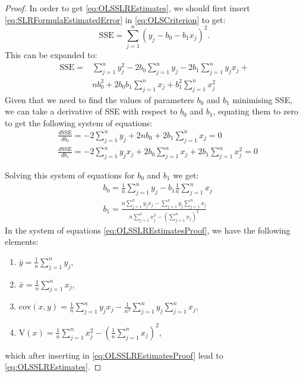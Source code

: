 \documentclass[
]{book}
\providecommand{\tightlist}{%
  \setlength{\itemsep}{0pt}\setlength{\parskip}{0pt}}
\theoremstyle{definition}
\theoremstyle{definition}
\theoremstyle{definition}
\theoremstyle{definition}
\theoremstyle{remark}
\begin{document}
\begin{proof}
In order to get \eqref{eq:OLSSLREstimates}, we should first insert \eqref{eq:SLRFormulaEstimatedError} in \eqref{eq:OLSCriterion} to get:
\begin{equation*}
    \mathrm{SSE} = \sum_{j=1}^n (y_j - {b}_0 - {b}_1 x_j)^2 .
\end{equation*}
This can be expanded to:
\begin{equation*}
    \begin{aligned}
        \mathrm{SSE} = & \sum_{j=1}^n y_j^2 - 2 b_0 \sum_{j=1}^n y_j - 2 b_1 \sum_{j=1}^n y_j x_j + \\
                       & n b_0^2 + 2 b_0 b_1 \sum_{j=1}^n x_j + b_1^2 \sum_{j=1}^n x_j^2
    \end{aligned}
\end{equation*}
Given that we need to find the values of parameters \(b_0\) and \(b_1\) minimising SSE, we can take a derivative of SSE with respect to \(b_0\) and \(b_1\), equating them to zero to get the following system of equations:
\begin{equation*}
    \begin{aligned}
        & \frac{d \mathrm{SSE}}{d b_0} = -2 \sum_{j=1}^n y_j + 2 n b_0 + 2 b_1 \sum_{j=1}^n x_j = 0 \\
        & \frac{d \mathrm{SSE}}{d b_1} = -2 \sum_{j=1}^n y_j x_j  + 2 b_0 \sum_{j=1}^n x_j + 2 b_1 \sum_{j=1}^n x_j^2 = 0
    \end{aligned}
\end{equation*}

Solving this system of equations for \(b_0\) and \(b_1\) we get:
\begin{equation}
    \begin{aligned}
        & b_0 = \frac{1}{n}\sum_{j=1}^n y_j - b_1 \frac{1}{n}\sum_{j=1}^n x_j \\
        & b_1 = \frac{n \sum_{j=1}^n y_j x_j - \sum_{j=1}^n y_j \sum_{j=1}^n x_j}{n \sum_{j=1}^n x_j^2 - \left(\sum_{j=1}^n x_j \right)^2}
    \end{aligned}
    \label{eq:OLSSLREstimatesProof}
\end{equation}
In the system of equations \eqref{eq:OLSSLREstimatesProof}, we have the following elements:

\begin{enumerate}
\def\labelenumi{\arabic{enumi}.}
\tightlist
\item
  \(\bar{y}=\frac{1}{n}\sum_{j=1}^n y_j\),
\item
  \(\bar{x}=\frac{1}{n}\sum_{j=1}^n x_j\),
\item
  \(\mathrm{cov}(x,y) = \frac{1}{n}\sum_{j=1}^n y_j x_j - \frac{1}{n^2}\sum_{j=1}^n y_j \sum_{j=1}^n x_j\),
\item
  \(\mathrm{V}(x) = \frac{1}{n}\sum_{j=1}^n x_j^2 - \left(\frac{1}{n} \sum_{j=1}^n x_j \right)^2\),
\end{enumerate}

which after inserting in \eqref{eq:OLSSLREstimatesProof} lead to \eqref{eq:OLSSLREstimates}.
\end{proof}
\end{document}
